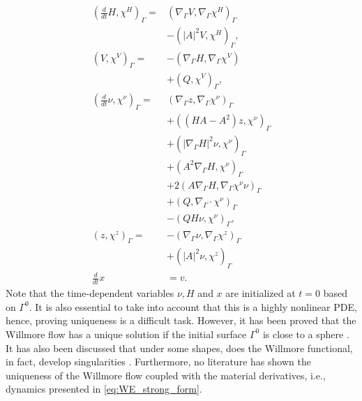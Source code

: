 \begin{subequations}
\label{eq:WE_weak_form}
\begin{align}
\left( \frac{d}{dt}H, \chi ^{H} \right)_{\Gamma } =&  \left( \nabla _{\Gamma } V, \nabla _{\Gamma }\chi ^{H} \right) _{\Gamma } \nonumber \\
                                                   &- \left( \left\lvert A \right\rvert ^2 V, \chi ^{H} \right) _{\Gamma },   \\
\left( V, \chi ^{V} \right)_{\Gamma } =& -\left( \nabla _{\Gamma } H, \nabla _{\Gamma } \chi ^{V} \right) \nonumber \\
 & + \left( Q, \chi ^{V} \right)_{\Gamma },   \\
\left( \frac{d}{dt} \nu , \chi ^{\nu } \right)_{\Gamma } =& \left( \nabla _{\Gamma }z, \nabla _{\Gamma } \chi ^{\nu } \right) _{\Gamma }\nonumber   \\
 & + \left( ( HA - A^2  )z,\chi^\nu  \right)_{\Gamma }   \nonumber \\
 & + \left( \left\lvert \nabla _{\Gamma } H \right\rvert^2 \nu , \chi ^{\nu }  \right)_{\Gamma} \nonumber  \\
 & + \left(  A^2\nabla _{\Gamma } H, \chi ^{\nu }  \right)_{\Gamma} \nonumber  \\
 & + 2 \left( A \nabla _{\Gamma } H, \nabla _{\Gamma } \chi ^{\nu } \nu  \right)_{\Gamma} \nonumber    \\
 &  + \left( Q, \nabla _{\Gamma } \cdot \chi ^{\nu }  \right)_{\Gamma } \nonumber  \\
  &- \left( QH\nu , \chi ^{\nu } \right) _{\Gamma},\\
\left( z, \chi ^{z} \right) _{\Gamma }  =& - \left( \nabla _{\Gamma } \nu , \nabla _{\Gamma } \chi ^{z} \right)_{\Gamma} \nonumber \\
                                         & + \left( \left\lvert A \right\rvert ^2 \nu , \chi ^{z} \right)_{\Gamma} \\
\frac{d}{dt}x &= v
.\end{align}
\end{subequations}
Note that the time-dependent variables $\nu, H $ and $x$ are initialized at $t=0$  based on $\Gamma ^{0}$. It is also essential to take into account that this is a highly nonlinear PDE, hence, proving uniqueness is a difficult task. However, it has been
proved that the Willmore flow has a unique solution if the initial surface $ \Gamma ^{0} $ is close to a sphere \cite{simonett2001willmore}. It has also been discussed that under some shapes, does the Willmore functional, in fact, develop
singularities \cite{mayer2002numerical}. Furthermore, no literature has shown the uniqueness of the Willmore flow coupled with the material derivatives, i.e., dynamics presented in \eqref{eq:WE_strong_form}.














